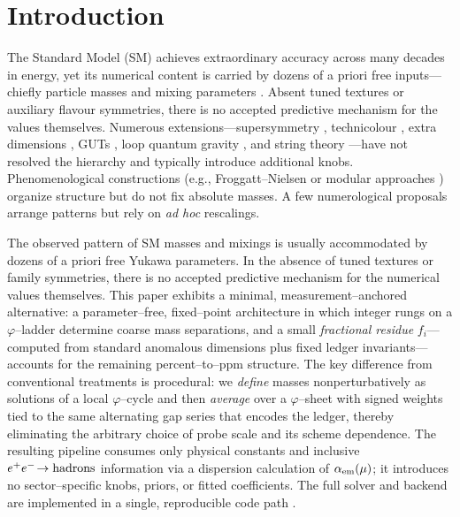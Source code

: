 \documentclass[%
  amsmath,amssymb,
  aps,
 prb,
 floatfix, showkeys
 ]{revtex4-2}
\begin{document}
 \section{Introduction}
 \label{sec-1}
 The Standard Model (SM) \cite{SM-ref,weinberg-book,Weinberg1979} achieves extraordinary accuracy across many decades in energy, yet its numerical content is carried by dozens of a priori free inputs—chiefly particle masses and mixing parameters \cite{PDG2022,PDG2025}. Absent tuned textures or auxiliary flavour symmetries, there is no accepted predictive mechanism for the values themselves. Numerous extensions—supersymmetry \cite{dine-1993,Wess1974}, technicolour \cite{Susskind1979,hill-2003,technicolor-2015}, extra dimensions \cite{Randall1999}, GUTs \cite{grand-uni-th-2015}, loop quantum gravity \cite{Rovelli2004,loop-qg}, and string theory \cite{polchinski-1998}—have not resolved the hierarchy and typically introduce additional knobs. Phenomenological constructions (e.g., Froggatt–Nielsen \cite{frog-1979,fritz-2000} or modular approaches \cite{petcov}) organize structure but do not fix absolute masses. A few numerological proposals \cite{koide-1983,eln-2002,eln-2002-1,cascade-2003} arrange patterns but rely on \emph{ad hoc} rescalings.
 
 The observed pattern of SM masses and mixings is usually accommodated by dozens of a priori free Yukawa parameters. In the absence of tuned textures or family symmetries, there is no accepted predictive mechanism for the numerical values themselves.
 This paper exhibits a minimal, measurement--anchored alternative: a parameter--free, fixed--point architecture in which integer rungs on a $\varphi$--ladder determine coarse mass separations, and a small \emph{fractional residue} $f_i$—computed from standard anomalous dimensions plus fixed ledger invariants—accounts for the remaining percent--to--ppm structure. The key difference from conventional treatments is procedural: we \emph{define} masses nonperturbatively as solutions of a local $\varphi$--cycle and then \emph{average} over a $\varphi$--sheet with signed weights tied to the same alternating gap series that encodes the ledger, thereby eliminating the arbitrary choice of probe scale and its scheme dependence. The resulting pipeline consumes only physical constants and inclusive $e^+e^-\!\to{\rm hadrons}$ information via a dispersion calculation of $\alpha_{\rm em}(\mu)$; it introduces no sector--specific knobs, priors, or fitted coefficients. The full solver and backend are implemented in a single, reproducible code path \cite{EidelmanJegerlehner1995,Jegerlehner2003,Keshavarzi2019,Davier2017,PDG2024}.
 
\end{document}
